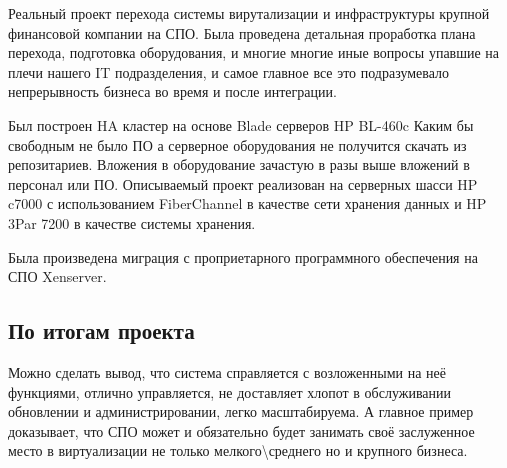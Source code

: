 \documentclass[10pt, a5paper]{article}
\begin{document}
Реальный проект перехода системы вирутализации и инфраструктуры крупной финансовой компании на СПО. Была проведена детальная проработка плана перехода, подготовка оборудования, и многие многие иные вопросы упавшие на плечи нашего IT подразделения, и самое главное все это подразумевало непрерывность бизнеса во время и после интеграции.

Был построен HA кластер на основе Blade серверов HP BL-460c
Каким бы свободным не было ПО а серверное оборудования не получится скачать из репозитариев. Вложения в оборудование зачастую в разы выше вложений в персонал или ПО.
Описываемый проект реализован на серверных шасси HP c7000 с использованием FiberChannel в качестве сети хранения данных и HP 3Par 7200 в качестве системы хранения.

Была произведена миграция с проприетарного программного обеспечения на СПО Xenserver.

\subsection*{По итогам проекта} 
Можно сделать вывод, что система справляется с возложенными на неё функциями, отлично управляется, не доставляет хлопот в обслуживании обновлении и администрировании, легко масштабируема. А главное пример доказывает, что СПО может и обязательно будет занимать своё заслуженное место в виртуализации не только мелкого\textbackslash{}среднего но и крупного бизнеса.
\end{document}
